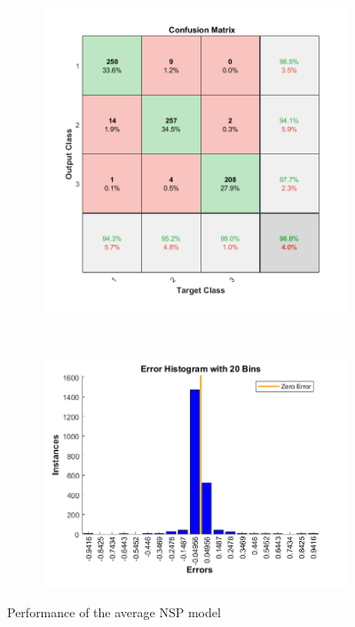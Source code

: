 \documentclass[11pt,a4paper]{article}
\begin{document}
\begin{figure}[htb]
  \centering
  \begin{subfigure}[b]{0.48\textwidth}
    \centering
    \includegraphics[width=\textwidth]{figures/NSP/avg_conf_matrix.png}
  \end{subfigure}
  ~
  \begin{subfigure}[b]{0.48\textwidth}
    \centering
    \includegraphics[width=\textwidth]{figures/NSP/avg_err_hist.png}
  \end{subfigure}
  \caption{Performance of the average NSP model}
  \label{fig:NSP_AVG}
\end{figure}
\end{document}
